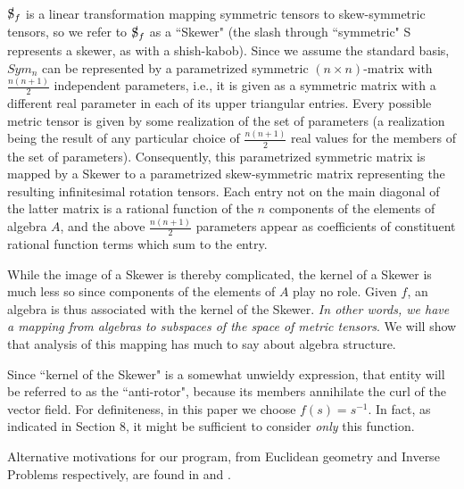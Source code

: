 \documentclass{amsart}
\theoremstyle{definition}
\numberwithin{theorem}{section}
\numberwithin{equation}{section}
\begin{document}
$\slashed{\text{S}}_f$ is a linear transformation mapping symmetric tensors to skew-symmetric tensors, so we refer to $\slashed{\text{S}}_f$ as a ``Skewer" (the slash through ``symmetric" S represents a skewer, as with a shish-kabob). Since we assume the standard basis, $Sym_n$ can be represented by a parametrized symmetric $(n\times n)$-matrix with $\frac{n(n+1)}{2}$ independent parameters, i.e., it is given as a symmetric matrix with a different real parameter in each of its upper triangular entries.  Every possible metric tensor is given by some realization of the set of parameters (a realization being the result of any particular choice of $\frac{n(n+1)}{2}$ real values for the members of the set of parameters).  Consequently, this parametrized symmetric matrix is mapped by a Skewer to a parametrized skew-symmetric matrix representing the resulting infinitesimal rotation tensors.  Each entry not on the main diagonal of the latter matrix is a rational function of the $n$ components of the elements of algebra $A$, and the above $\frac{n(n+1)}{2}$ parameters appear as coefficients of constituent rational function terms which sum to the entry.  

While the image of a Skewer is thereby complicated, the kernel of a Skewer is much less so since components of the elements of $A$ play no role.  Given $f$, an algebra is thus associated with the kernel of the Skewer.  {\it In other words, we have a mapping from algebras to subspaces of the space of metric tensors}.     We will show that analysis of this mapping has much to say about algebra structure.

Since ``kernel of the Skewer" is a somewhat unwieldy expression, that entity will be referred to as the ``anti-rotor", because its members annihilate the curl of the vector field.  For definiteness, in this paper we choose $f(s)=s^{-1}$.  In fact, as indicated in Section 8, it might be sufficient to consider {\it only} this function.

Alternative motivations for our program, from Euclidean geometry and Inverse Problems respectively, are found in \cite{fgreensite:2025b} and \cite{fgreensite:2025c}.
\end{document}
